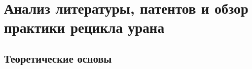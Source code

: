 \chapter{Анализ литературы, патентов и обзор практики рецикла урана}\label{ch:ch1}

\section{Теоретические основы}









